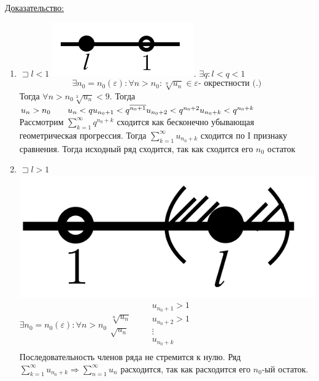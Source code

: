 \documentclass[12pt]{article}
\let\ORIincludegraphics\includegraphics
\renewcommand{\includegraphics}[2][]{\ORIincludegraphics[scale=0.65,#1]{#2}}
\let\oldsum\sum
\renewcommand{\sum}{\oldsum\limits}
\begin{document}
  \pagebreak

  \underline{Доказательство:}
  \begin{adjustwidth}{1.5em}{1.5em}
    \begin{enumerate}
    \item $\sqsupset l<1$ \includegraphics[scale=0.6]{10.4.4.png}. $\exists q:l<q<1$\\

    \[ \exists n_0=n_0(\varepsilon):\forall n>n_0: \sqrt[n]{u_n} \in \varepsilon \text{- окрестности (.)} \]    
    Тогда $\forall n>n_0 \sqrt[3]{u_n}<9.$ Тогда\\
    $
      u_n>n_0 \hspace{20pt} u_n<q\\
      u_{n_0+1}<q^{\overline{n_0+1}}\\
      u_{n_0+2}<q^{n_0+2}\\
      u_{n_0+k}<q^{n_0+k}
    $\\
    Рассмотрим $\sum_{k=1}^{\infty} q^{n_0+k}$ сходится как бесконечно убывающая геометрическая прогрессия. Тогда
    $\sum_{k=1}^{\infty} u_{n_0+k}$ сходится по I признаку сравнения. Тогда исходный ряд сходится, так как сходится его 
    $n_0$ остаток

    \item $\sqsupset l>1$ \includegraphics[scale=0.2]{10.4.5.png}\\
    $\exists n_0=n_0(\varepsilon):\forall n>n_0 
    \begin{matrix}
      \sqrt[n]{u_n}\\
      \sqrt{u_n}
    \end{matrix}
    \hspace{20pt}
    \begin{matrix}
      u_{n_0+1}>1\\
      u_{n_0+2}>1\\
      \vdots\\
      u_{n_0+k}\\
    \end{matrix}
    $\\
    Последовательность членов ряда не стремится к нулю. Ряд $\sum_{k=1}^{\infty} u_{n_0+k} \Rightarrow
    \sum_{n=1}^{\infty} u_n$ расходится, так как расходится его $n_0$-ый остаток.
    \end{enumerate}
  \end{adjustwidth}
\end{document}
